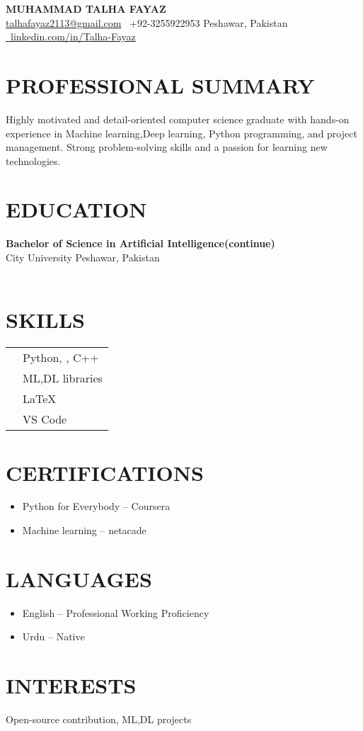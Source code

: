 \documentclass[a4paper,10pt]{article}
\newcommand{\heading}[1]{\section*{\uppercase{#1}}}
\begin{document}
\begin{center}
    {\Huge \textbf{MUHAMMAD TALHA FAYAZ}}\\[4pt]
    \href{mailto:talhafayaz2113@gmail.com}{talhafayaz2113@gmail.com} \quad
    \faPhone\ +92-3255922953 \quad
    \faMapMarker*{} Peshawar, Pakistan \quad
    \href{https://www.linkedin.com/in/Talha-Fayaz}{\faLinkedin\ linkedin.com/in/Talha-Fayaz}
\end{center}

\heading{Professional Summary}
Highly motivated and detail-oriented computer science graduate with hands-on experience in Machine learning,Deep learning, Python programming, and project management. Strong problem-solving skills and a passion for learning new technologies.

\heading{Education}
\textbf{Bachelor of Science in Artificial Intelligence(continue)} \\
City University  Peshawar, Pakistan \\

\



\heading{Skills}
\begin{tabular}{ll}
\faCode{}        & Python, , C++ \\
\faLaptopCode{}  & ML,DL libraries \\
\faPenNib{}      & \LaTeX \\
\faTools{}       & VS Code\\
\end{tabular}

\heading{Certifications}
\begin{itemize}[leftmargin=*]
    \item Python for Everybody – Coursera
    \item Machine learning – netacade
\end{itemize}

\heading{Languages}
\begin{itemize}[leftmargin=*]
    \item English – Professional Working Proficiency
    \item Urdu – Native
\end{itemize}

\heading{Interests}
Open-source contribution, ML,DL projects 
\end{document}
